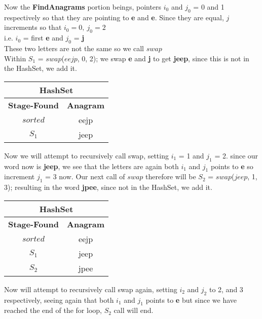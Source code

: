 \documentclass[12pt]{article}
\begin{document}
Now the \textbf{FindAnagrams} portion beings, pointers $i_0$ and $j_0$ = 0 and 1 respectively
so that they are pointing to \textbf{e} and \textbf{e}. Since they are equal, $j$ increments
so that $i_0 = 0,\ j_0 = 2$ \\ \indent i.e. $i_0$ = first \textbf{e} and $j_0$ = \textbf{j} \\ These two
letters are not the same so we call $swap$ \\
\indent Within $S_1$ = $swap$($eejp$, 0, 2); we swap \textbf{e} and \textbf{j} to get \textbf{jeep}, since
this is not in the HashSet, we add it.

\begin{center}
\begin{tabular}{ |c|c| }
    \hline
    \multicolumn{2}{|c|}{HashSet} \\
    \hline
    \textbf{Stage-Found} & \textbf{Anagram} \\
    \hline
    $sorted$ & eejp \\
    \hline
    $S_1$ & jeep \\
    \hline
\end{tabular}
\end{center}

Now we will attempt to recursively call swap, setting $i_1$ = 1 and $j_1$ = 2. since our word now is \textbf{jeep},
we see that the letters are again both $i_1$ and $j_1$ points to \textbf{e} so increment $j_1$ = 3 now.  Our next
call of $swap$ therefore will be $S_2$ =  $swap$($jeep$, 1, 3); resulting in the word \textbf{jpee}, since not in the
HashSet, we add it.

\begin{center}
\begin{tabular}{ |c|c| }
    \hline
    \multicolumn{2}{|c|}{HashSet} \\
    \hline
    \textbf{Stage-Found} & \textbf{Anagram} \\
    \hline
    $sorted$ & eejp \\
    \hline
    $S_1$ & jeep \\
    \hline
    $S_2$ & jpee \\
    \hline
\end{tabular}
\end{center}

Now will attempt to recursively call swap again, setting $i_2$ and $j_2$ to 2, and 3 respectively, seeing again that
both $i_1$ and $j_1$ points to \textbf{e} but since we have reached the end of the for loop, $S_2$ call will end.
\end{document}
